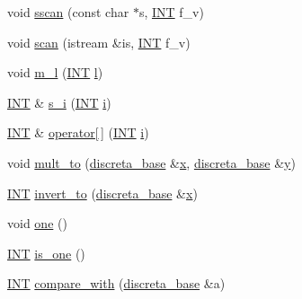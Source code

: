 \begin{DoxyCompactItemize}
\item 
void \mbox{\hyperlink{classpermutation_a7074b329f809b23ba083e1a74b90bd03}{sscan}} (const char $\ast$s, \mbox{\hyperlink{galois_8h_a09fddde158a3a20bd2dcadb609de11dc}{I\+NT}} f\+\_\+v)
\item 
void \mbox{\hyperlink{classpermutation_a826e0fbc7234cbbff949d3e31a863d0a}{scan}} (istream \&is, \mbox{\hyperlink{galois_8h_a09fddde158a3a20bd2dcadb609de11dc}{I\+NT}} f\+\_\+v)
\item 
void \mbox{\hyperlink{classpermutation_a9cf73421f89b2c24cf2d08f002752030}{m\+\_\+l}} (\mbox{\hyperlink{galois_8h_a09fddde158a3a20bd2dcadb609de11dc}{I\+NT}} \mbox{\hyperlink{alphabet2_8_c_a89606eca6b563ec68d2da2e84657736f}{l}})
\item 
\mbox{\hyperlink{galois_8h_a09fddde158a3a20bd2dcadb609de11dc}{I\+NT}} \& \mbox{\hyperlink{classpermutation_ab8c74af5111dbf8808da04214b918873}{s\+\_\+i}} (\mbox{\hyperlink{galois_8h_a09fddde158a3a20bd2dcadb609de11dc}{I\+NT}} \mbox{\hyperlink{alphabet2_8_c_acb559820d9ca11295b4500f179ef6392}{i}})
\item 
\mbox{\hyperlink{galois_8h_a09fddde158a3a20bd2dcadb609de11dc}{I\+NT}} \& \mbox{\hyperlink{classpermutation_a447586a078cb487c97793a9d5d5ade28}{operator\mbox{[}$\,$\mbox{]}}} (\mbox{\hyperlink{galois_8h_a09fddde158a3a20bd2dcadb609de11dc}{I\+NT}} \mbox{\hyperlink{alphabet2_8_c_acb559820d9ca11295b4500f179ef6392}{i}})
\item 
void \mbox{\hyperlink{classpermutation_abbd320f211ed730261c31fecd5a567bb}{mult\+\_\+to}} (\mbox{\hyperlink{classdiscreta__base}{discreta\+\_\+base}} \&\mbox{\hyperlink{alphabet2_8_c_a6150e0515f7202e2fb518f7206ed97dc}{x}}, \mbox{\hyperlink{classdiscreta__base}{discreta\+\_\+base}} \&\mbox{\hyperlink{alphabet2_8_c_a0a2f84ed7838f07779ae24c5a9086d33}{y}})
\item 
\mbox{\hyperlink{galois_8h_a09fddde158a3a20bd2dcadb609de11dc}{I\+NT}} \mbox{\hyperlink{classpermutation_a1209ecbc8fdb0320a38218bd0c15c5fa}{invert\+\_\+to}} (\mbox{\hyperlink{classdiscreta__base}{discreta\+\_\+base}} \&\mbox{\hyperlink{alphabet2_8_c_a6150e0515f7202e2fb518f7206ed97dc}{x}})
\item 
void \mbox{\hyperlink{classpermutation_a358377181aea843bd774f0dfb3822b7f}{one}} ()
\item 
\mbox{\hyperlink{galois_8h_a09fddde158a3a20bd2dcadb609de11dc}{I\+NT}} \mbox{\hyperlink{classpermutation_ac86938f55c0b8af01d1f22c813310b97}{is\+\_\+one}} ()
\item 
\mbox{\hyperlink{galois_8h_a09fddde158a3a20bd2dcadb609de11dc}{I\+NT}} \mbox{\hyperlink{classpermutation_ae331b031f81647c88e72e966555c9c8f}{compare\+\_\+with}} (\mbox{\hyperlink{classdiscreta__base}{discreta\+\_\+base}} \&a)

\end{DoxyCompactItemize}

